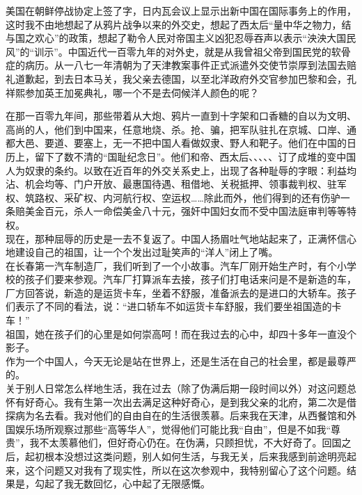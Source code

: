 美国在朝鲜停战协定上签了字，日内瓦会议上显示出新中国在国际事务上的作用，这时我不由地想起了从鸦片战争以来的外交史，想起了西太后“量中华之物力，结与国之欢心”的政策，想起了勒令人民对帝国主义凶犯忍辱吞声以表示“泱泱大国民风”的“训示”。中国近代一百零九年的对外史，就是从我曾祖父帝到国民党的软骨症的病历。从一八七一年清朝为了天津教案事件正式派遣外交使节崇厚到法国去赔礼道歉起，到去日本马关，我父亲去德国，以至北洋政府外交官参加巴黎和会，孔祥熙参加英王加冕典礼，哪一个不是去伺候洋人颜色的呢？

在那一百零九年间，那些带着从大炮、鸦片一直到十字架和口香糖的自以为文明、高尚的人，他们到中国来，任意地烧、杀。抢、骗，把军队驻扎在京城、口岸、通都大邑、要道、要塞上，无一不把中国人看做奴隶、野人和靶子。他们在中国的日历上，留下了数不清的“国耻纪念日”。他们和帝、西太后、、、、、订了成堆的变中国人为奴隶的条约。以致在近百年的外交关系史上，出现了各种耻辱的字眼：利益均沾、机会均等、门户开放、最惠国待遇、租借地、关税抵押、领事裁判权、驻军权、筑路权、采矿权、内河航行权、空运权……除此而外，他们得到的还有伤驴一条赔美金百元，杀人一命偿美金八十元，强奸中国妇女而不受中国法庭审判等等特权。\\

现在，那种屈辱的历史是一去不复返了。中国人扬眉吐气地站起来了，正满怀信心地建设自己的祖国，让一个个发出过耻笑声的“洋人”闭上了嘴。\\

在长春第一汽车制造厂，我们听到了一个小故事。汽车厂刚开始生产时，有个小学校的孩子们要来参观。汽车厂打算派车去接，孩子们打电话来问是不是新造的车，厂方回答说，新造的是运货卡车，坐着不舒服，准备派去的是进口的大轿车。孩子们表示了不同的看法，说：“进口轿车不如运货卡车舒服，我们要坐祖国造的卡车！”\\

祖国，她在孩子们的心里是如何崇高呵！而在我过去的心中，却四十多年一直没个影子。\\

作为一个中国人，今天无论是站在世界上，还是生活在自己的社会里，都是最尊严的。\\

关于别人日常怎么样地生活，我在过去（除了伪满后期一段时间以外）对这问题总怀有好奇心。我有生第一次出去满足这种好奇心，是到我父亲的北府，第二次是借探病为名去看。我对他们的自由自在的生活很羡慕。后来我在天津，从西餐馆和外国娱乐场所观察过那些“高等华人”，觉得他们可能比我“自由”，但是不如我“尊贵”，我不太羡慕他们，但好奇心仍在。在伪满，只顾担忧，不大好奇了。回国之后，起初根本没想过这类问题，别人如何生活，与我无关，后来我感到前途明亮起来，这个问题又对我有了现实性，所以在这次参观中，我特别留心了这个问题。结果是，勾起了我无数回忆，心中起了无限感慨。\\

